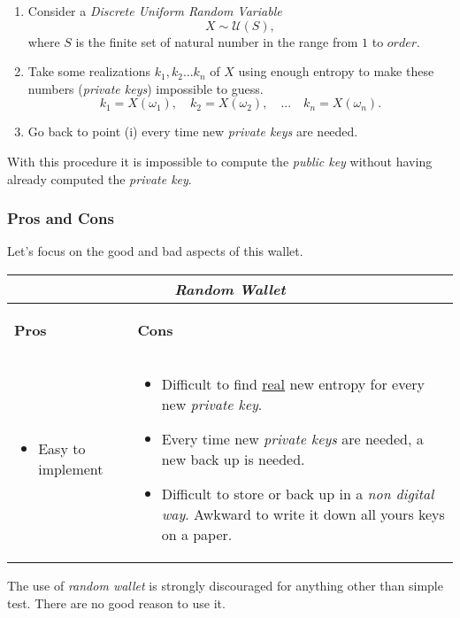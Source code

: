 \begin{enumerate}[label=(\roman*)]
	\item Consider a \textit{Discrete Uniform Random Variable}
	\begin{equation*}
	X\sim \mathcal{U}(S),
	\end{equation*}
	where $S$ is the finite set of natural number in the range from $1$ to $order$.
	\item Take some realizations $k_1,k_2...k_n$ of $X$ using enough entropy to make these numbers (\textit{private keys}) impossible to guess.
	\begin{equation*}
	k_1=X(\omega_1), \quad  k_2=X(\omega_2), \quad ... \quad k_n=X(\omega_n).
	\end{equation*}
	\item Go back to point (i) every time new \textit{private keys} are needed.
\end{enumerate}
With this procedure it is impossible to compute the \textit{public key} without having already computed the \textit{private key}.

\subsubsection{Pros and Cons}
Let's focus on the good and bad aspects of this wallet.

\begin{center}
	\begin{tabular}{ |p{6cm}|p{6cm}|  }
		\hline
		\multicolumn{2}{|c|}{\textbf{\textit{Random Wallet}}} \\
		\hline \hline 
		\begin{center}
			\textbf{Pros}
		\end{center}&\begin{center}
			\textbf{Cons}
		\end{center}\\
		\hline
		\begin{itemize}
			\item Easy to implement
		\end{itemize} &
		\begin{itemize}
			\item Difficult to find \underline{real} new entropy for every new \textit{private key}.
			\item Every time new \textit{private keys} are needed, a new back up is needed.
			\item Difficult to store or back up in a \textit{non digital way}. Awkward to write it down all yours keys on a paper.
		\end{itemize}\\
		\hline
	\end{tabular}
\end{center}
The use of \textit{random wallet} is strongly discouraged for anything other than simple test. There are no good reason to use it.

